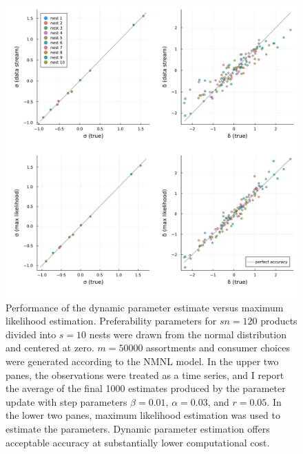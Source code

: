 \documentclass[preprint,12pt,authoryear]{elsarticle}
\begin{document}
\begin{figure}
\begin{center}\includegraphics[width=\linewidth, ]{../plots/param-est-dynamic-nested-as-static.pdf}\end{center}
\captionsetup{singlelinecheck=off}
    \caption[.]{Performance of the dynamic parameter estimate versus maximum likelihood estimation. Preferability parameters for $sn = 120$ products divided into $s=10$ nests were drawn from the normal distribution and centered at zero. $m=50000$ assortments and consumer choices were generated according to the NMNL model. In the upper two panes, the observations were treated as a time series, and I report the average of the final 1000 estimates produced by the parameter update with step parameters $\beta = 0.01$, $\alpha = 0.03$, and $r = 0.05$. In the lower two panes, maximum likelihood estimation was used to estimate the parameters. Dynamic parameter estimation offers acceptable accuracy at substantially lower computational cost.}
\label{param-est-dynamic-nested-as-static}
\end{figure}
\end{document}
